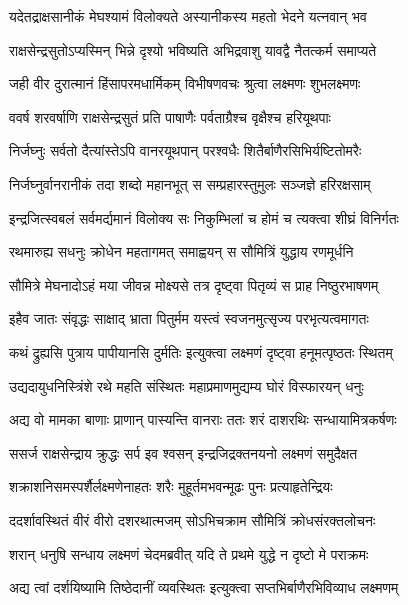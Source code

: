 \twolineshloka
{यदेतद्राक्षसानीकं मेघश्यामं विलोक्यते}
{अस्यानीकस्य महतो भेदने यत्नवान् भव} %

\twolineshloka
{राक्षसेन्द्रसुतोऽप्यस्मिन् भिन्ने दृश्यो भविष्यति}
{अभिद्रवाशु यावद्वै नैतत्कर्म समाप्यते} %

\twolineshloka
{जही वीर दुरात्मानं हिंसापरमधार्मिकम्}
{विभीषणवचः श्रुत्वा लक्ष्मणः शुभलक्ष्मणः} %

\twolineshloka
{ववर्ष शरवर्षाणि राक्षसेन्द्रसुतं प्रति}
{पाषाणैः पर्वताग्रैश्च वृक्षैश्च हरियूथपाः} %

\twolineshloka
{निर्जघ्नुः सर्वतो दैत्यांस्तेऽपि वानरयूथपान्}
{परश्वधैः शितैर्बाणैरसिभिर्यष्टितोमरैः} %

\twolineshloka
{निर्जघ्नुर्वानरानीकं तदा शब्दो महानभूत्}
{स सम्प्रहारस्तुमुलः सञ्जज्ञे हरिरक्षसाम्} %

\twolineshloka
{इन्द्रजित्स्वबलं सर्वमर्द्यमानं विलोक्य सः}
{निकुम्भिलां च होमं च त्यक्त्वा शीघ्रं विनिर्गतः} %

\twolineshloka
{रथमारुह्य सधनुः क्रोधेन महतागमत्}
{समाह्वयन् स सौमित्रिं युद्धाय रणमूर्धनि} %

\twolineshloka
{सौमित्रे मेघनादोऽहं मया जीवन्न मोक्ष्यसे}
{तत्र दृष्ट्वा पितृव्यं स प्राह निष्ठुरभाषणम्} %

\twolineshloka
{इहैव जातः संवृद्धः साक्षाद् भ्राता पितुर्मम}
{यस्त्वं स्वजनमुत्सृज्य परभृत्यत्वमागतः} %

\twolineshloka
{कथं द्रुह्यसि पुत्राय पापीयानसि दुर्मतिः}
{इत्युक्त्वा लक्ष्मणं दृष्ट्वा हनूमत्पृष्ठतः स्थितम्} %

\twolineshloka
{उद्यदायुधनिस्त्रिंशे रथे महति संस्थितः}
{महाप्रमाणमुद्यम्य घोरं विस्फारयन् धनुः} %

\twolineshloka
{अद्य वो मामका बाणाः प्राणान् पास्यन्ति वानराः}
{ततः शरं दाशरथिः सन्धायामित्रकर्षणः} %

\twolineshloka
{ससर्ज राक्षसेन्द्राय क्रुद्धः सर्प इव श्वसन्}
{इन्द्रजिद्रक्तनयनो लक्ष्मणं समुदैक्षत} %

\twolineshloka
{शक्राशनिसमस्पर्शैर्लक्ष्मणेनाहतः शरैः}
{मुहूर्तमभवन्मूढः पुनः प्रत्याहृतेन्द्रियः} %

\twolineshloka
{ददर्शावस्थितं वीरं वीरो दशरथात्मजम्}
{सोऽभिचक्राम सौमित्रिं क्रोधसंरक्तलोचनः} %

\twolineshloka
{शरान् धनुषि सन्धाय लक्ष्मणं चेदमब्रवीत्}
{यदि ते प्रथमे युद्धे न दृष्टो मे पराक्रमः} %

\twolineshloka
{अद्य त्वां दर्शयिष्यामि तिष्ठेदानीं व्यवस्थितः}
{इत्युक्त्वा सप्तभिर्बाणैरभिविव्याध लक्ष्मणम्} %

